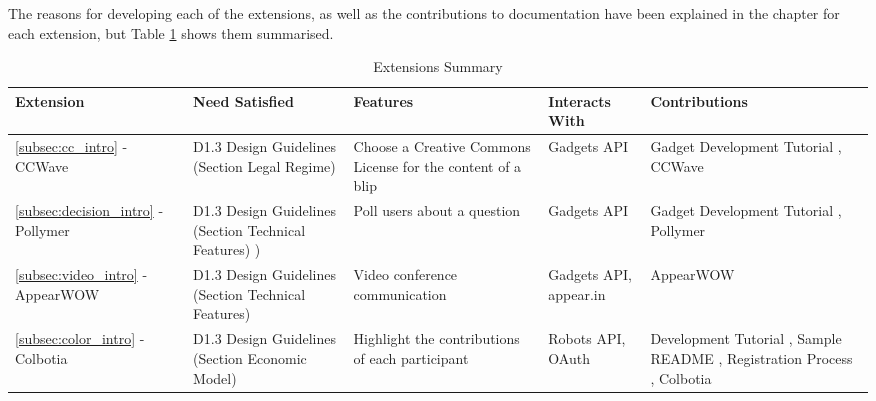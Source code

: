 The reasons for developing each of the extensions, as well as the contributions to documentation have been explained in the chapter for each extension, but Table \ref{fig:contributions} shows them summarised.
\begin{table}[h]
  \footnotesize
  \begin{center}
    \begin{tabular}{ | l | p{2.49cm} | p{2.1cm} | p{2.2cm} | p{2.3cm} |}
      \hline
      \textbf{Extension} & \textbf{Need Satisfied} & \textbf{Features} & \textbf{Interacts With} & \textbf{Contributions}\\
      \hline
      \ref{subsec:cc_intro} - CCWave & D1.3 Design Guidelines (Section Legal Regime) \cite{ref:p2pvalue} & Choose a Creative Commons License for the content of a blip & Gadgets API & Gadget Development Tutorial \cite{ref:gadget_development}, CCWave \cite{ref:cc_github}\\
      \hline
      \ref{subsec:decision_intro} - Pollymer & D1.3 Design Guidelines (Section Technical Features) \cite{ref:p2pvalue}) & Poll users about a question & Gadgets API & Gadget Development Tutorial \cite{ref:gadget_development}, Pollymer \cite{ref:decision_github}\\
      \hline
      \ref{subsec:video_intro} - AppearWOW & D1.3 Design Guidelines (Section Technical Features) \cite{ref:p2pvalue} & Video conference communication & Gadgets API, appear.in & AppearWOW \cite{ref:video_github}\\
      \hline
      \ref{subsec:color_intro} - Colbotia & D1.3 Design Guidelines (Section Economic Model) \cite{ref:p2pvalue} & Highlight the contributions of each participant & Robots API, OAuth & Development Tutorial \cite{ref:robot_development}, Sample README \cite{ref:readme_sample}, Registration Process \cite{ref:registration_process}, Colbotia \cite{ref:colorizer_github}\\
      \hline
    \end{tabular}
  \end{center}
  \caption{Extensions Summary}
  \label{fig:contributions}
\end{table}
